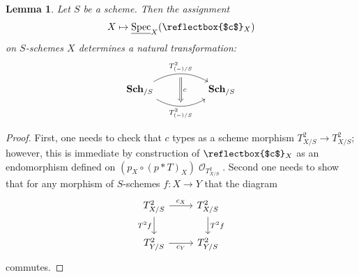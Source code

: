 \documentclass{amsart}
\newtheorem{lemma}[equation]{Lemma}
\theoremstyle{definition}
\DeclareMathOperator{\Ocal}{\mathcal{O}}
\DeclareMathOperator{\Spec}{Spec}
\newcommand{\RelSpec}[1]{\underline{\Spec}_{#1}}
\DeclareMathOperator{\Sch}{\mathbf{Sch}}
\numberwithin{equation}{subsection}
\begin{document}
\begin{lemma}\label{Lemma: Section Tangent: Canonical flip is natural transf on schemes}
Let $S$ be a scheme. Then the assignment
\[
X \mapsto \RelSpec{X}(\reflectbox{$c$}_X)
\]
on $S$-schemes $X$ determines a natural transformation:
\[
\begin{tikzcd}
\Sch_{/S}\ar[rr, bend left = 30, ""{name = U}]{}{T^{2}_{(-)/S}} \ar[rr, swap, bend right = 30, ""{name =D}]{}{T^{2}_{(-)/S}} & & \Sch_{/S}
\ar[from = U, to = D, Rightarrow, shorten <= 4pt, shorten >= 4pt]{}{c}
\end{tikzcd}
\]
\end{lemma}
\begin{proof}
First, one needs to check that $c$ types as a scheme morphism $T^2_{X/S} \to T^2_{X/S}$; however, this is immediate by construction of $\reflectbox{$c$}_X$ as an endomorphism defined on $(p_X \circ (p \ast T)_X)\Ocal_{T^2_{X/S}}$. Second one needs to show that for any morphism of $S$-schemes $f:X \to Y$ that the diagram
\[
\begin{tikzcd}
T^{2}_{X/S} \ar[r]{}{c_X} \ar[d, swap]{}{T^2f} & T^{2}_{X/S} \ar[d]{}{T^2f} \\
T^{2}_{Y/S} \ar[r, swap]{}{c_Y} & T^2_{Y/S}
\end{tikzcd}
\]
commutes. 


\end{proof}
\end{document}

